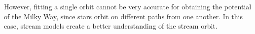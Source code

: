 \documentclass[preprint]{aastex}
\begin{document}
However, fitting a single orbit cannot be very accurate for obtaining the potential of the Milky Way, since stars orbit on different paths from one another. In this case, stream models create a better understanding of the stream orbit.


\end{document}
